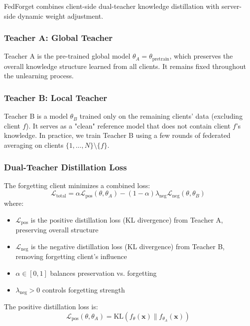 \documentclass[11pt,a4paper]{article}
\begin{document}
FedForget combines client-side dual-teacher knowledge distillation with server-side dynamic weight adjustment.

\subsubsection{Teacher A: Global Teacher}

Teacher A is the pre-trained global model $\theta_A = \theta_{\text{pretrain}}$, which preserves the overall knowledge structure learned from all clients. It remains fixed throughout the unlearning process.

\subsubsection{Teacher B: Local Teacher}

Teacher B is a model $\theta_B$ trained only on the remaining clients' data (excluding client $f$). It serves as a "clean" reference model that does not contain client $f$'s knowledge. In practice, we train Teacher B using a few rounds of federated averaging on clients $\{1, \ldots, N\} \setminus \{f\}$.

\subsubsection{Dual-Teacher Distillation Loss}

The forgetting client minimizes a combined loss:
\begin{equation}
\mathcal{L}_{\text{total}} = \alpha \mathcal{L}_{\text{pos}}(\theta, \theta_A) - (1-\alpha) \lambda_{\text{neg}} \mathcal{L}_{\text{neg}}(\theta, \theta_B)
\end{equation}
where:
\begin{itemize}
\item $\mathcal{L}_{\text{pos}}$ is the positive distillation loss (KL divergence) from Teacher A, preserving overall structure
\item $\mathcal{L}_{\text{neg}}$ is the negative distillation loss (KL divergence) from Teacher B, removing forgetting client's influence
\item $\alpha \in [0,1]$ balances preservation vs. forgetting
\item $\lambda_{\text{neg}} > 0$ controls forgetting strength
\end{itemize}

The positive distillation loss is:
\begin{equation}
\mathcal{L}_{\text{pos}}(\theta, \theta_A) = \text{KL}(f_\theta(\mathbf{x}) \| f_{\theta_A}(\mathbf{x}))
\end{equation}
\end{document}

